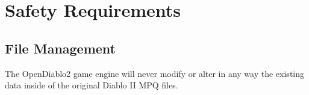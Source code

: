 \section{Safety Requirements} \label{sec:safetyrequirements}


\subsection{File Management}
The OpenDiablo2 game engine will never modify or alter in any way the existing
data inside of the original Diablo II MPQ files.
